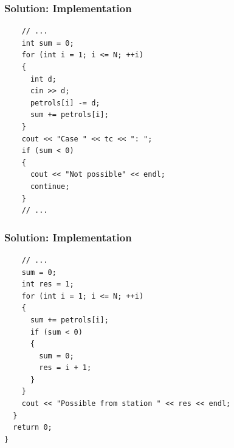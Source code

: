 \documentclass{beamer}
\newcommand{\uvalink}[2]{UVa Online Judge (http://uva.onlinejudge.org)
  problem number \href{#2}{\textcolor{blue}{#1}.}}
\newcounter{exo}
\newcommand{\exo}{
  \addtocounter{exo}{1}
  Exercice \arabic{exo}
}
\begin{document}
\begin{frame}[containsverbatim]
\frametitle{Solution: Implementation}

\scriptsize
\begin{lstlisting}
    // ...
    int sum = 0;
    for (int i = 1; i <= N; ++i)
    {
      int d;
      cin >> d;
      petrols[i] -= d;
      sum += petrols[i];
    }
    cout << "Case " << tc << ": ";
    if (sum < 0)
    {
      cout << "Not possible" << endl;
      continue;
    }
    // ...
\end{lstlisting}

\end{frame}

\begin{frame}[containsverbatim]
\frametitle{Solution: Implementation}

\scriptsize
\begin{lstlisting}
    // ...
    sum = 0;
    int res = 1;
    for (int i = 1; i <= N; ++i)
    {
      sum += petrols[i];
      if (sum < 0)
      {
        sum = 0;
        res = i + 1;
      }
    }
    cout << "Possible from station " << res << endl;
  }
  return 0;
}
\end{lstlisting}

\end{frame}

\fi


\ifanswers
\end{document}

